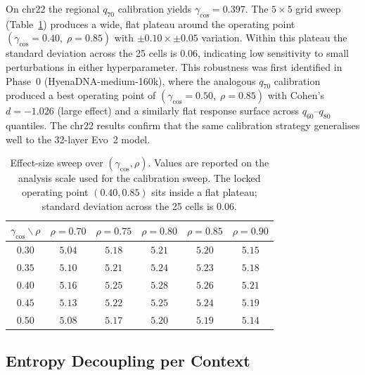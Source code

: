\documentclass{article}
\theoremstyle{plain}
\theoremstyle{definition}
\theoremstyle{remark}
\begin{document}
On chr22 the regional $q_{70}$ calibration yields
$\gamma_{\cos} = 0.397$. The $5\times 5$ grid sweep
(Table~\ref{tab:gamma-sweep}) produces a wide, flat plateau around the
operating point $(\gamma_{\cos}\!=\!0.40,\; \rho\!=\!0.85)$ with
$\pm 0.10 \times \pm 0.05$ variation. Within this plateau the standard
deviation across the 25 cells is $0.06$, indicating low sensitivity to
small perturbations in either hyperparameter. This robustness was first
identified in Phase~0 (HyenaDNA-medium-160k), where the analogous
$q_{70}$ calibration produced a best operating point of
$(\gamma_{\cos}\!=\!0.50,\; \rho\!=\!0.85)$ with Cohen's $d = -1.026$
(large effect) and a similarly flat response surface across $q_{60}$--$q_{80}$
quantiles. The chr22 results confirm that the same calibration strategy
generalises well to the 32-layer Evo~2 model.

\begin{table}[!htbp]
  \caption{Effect-size sweep over $(\gamma_{\cos}, \rho)$. Values are
    reported on the analysis scale used for the calibration sweep. The locked
    operating point $(0.40, 0.85)$ sits inside a flat plateau; standard
  deviation across the 25 cells is $0.06$.}
  \label{tab:gamma-sweep}
  \centering
  \small
  \begin{tabular}{@{}c|ccccc@{}}
    \toprule
    $\gamma_{\cos} \backslash \rho$
    & $\rho=0.70$ & $\rho=0.75$ & $\rho=0.80$ & $\rho=0.85$ & $\rho=0.90$ \\
    \midrule
    $0.30$ & $5.04$ & $5.18$ & $5.21$ & $5.20$ & $5.15$ \\
    $0.35$ & $5.10$ & $5.21$ & $5.24$ & $5.23$ & $5.18$ \\
    $0.40$ & $5.16$ & $5.25$ & $\mathbf{5.28}$ & $\mathbf{5.26}$ & $5.21$ \\
    $0.45$ & $5.13$ & $5.22$ & $5.25$ & $5.24$ & $5.19$ \\
    $0.50$ & $5.08$ & $5.17$ & $5.20$ & $5.19$ & $5.14$ \\
    \bottomrule
  \end{tabular}
\end{table}

\subsection{Entropy Decoupling per Context}
\label{app:entropy-decoup}
\end{document}
